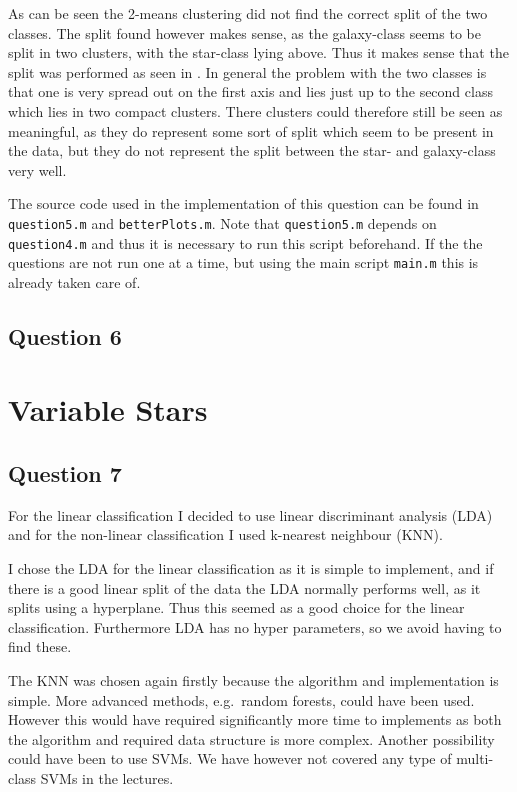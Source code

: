 \documentclass[a4paper, 11pt]{article}
\begin{document}
As can be seen the 2-means clustering did not find the correct split of the two classes. The split found however makes sense, as the galaxy-class seems to be split in two clusters, with the star-class lying above. Thus it makes sense that the split was performed as seen in . In general the problem with the two classes is that one is very spread out on the first axis and lies just up to the second class which lies in two compact clusters. There clusters could therefore still be seen as meaningful, as they do represent some sort of split which seem to be present in the data, but they do not represent the split between the star- and galaxy-class very well.

The source code used in the implementation of this question can be found in \texttt{question5.m} and \texttt{betterPlots.m}. Note that \texttt{question5.m} depends on \texttt{question4.m} and thus it is necessary to run this script beforehand. If the the questions are not run one at a time, but using the main script \texttt{main.m} this is already taken care of.

\subsection*{Question 6} %


\section{Variable Stars} %
\label{sec:variable_stars}

\subsection*{Question 7}

For the linear classification I decided to use linear discriminant analysis (LDA) and for the non-linear classification I used k-nearest neighbour (KNN).

I chose the LDA for the linear classification as it is simple to implement, and if there is a good linear split of the data the LDA normally performs well, as it splits using a hyperplane. Thus this seemed as a good choice for the linear classification. Furthermore LDA has no hyper parameters, so we avoid having to find these.

The KNN was chosen again firstly because the algorithm and implementation is simple. More advanced methods, e.g.\ random forests, could have been used. However this would have required significantly more time to implements as both the algorithm and required data structure is more complex. Another possibility could have been to use SVMs. We have however not covered any type of multi-class SVMs in the lectures.
\end{document}
